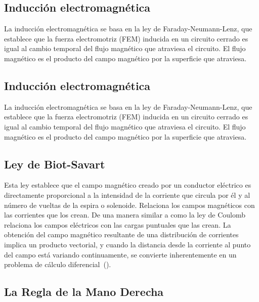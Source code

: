 \documentclass[twocolumn, 12pt]{article}
\begin{document}
\subsection*{Inducción electromagnética}

La inducción electromagnética se basa en la ley de
Faraday-Neumann-Lenz, que establece que la fuerza
electromotriz (FEM) inducida en un circuito cerrado es
igual al cambio temporal del flujo magnético que atraviesa
el circuito. El flujo magnético es el producto del campo
magnético por la superficie que atraviesa.

\subsection*{Inducción electromagnética}

La inducción electromagnética se basa en la ley de
Faraday-Neumann-Lenz, que establece que la fuerza
electromotriz (FEM) inducida en un circuito cerrado es
igual al cambio temporal del flujo magnético que atraviesa
el circuito. El flujo magnético es el producto del campo
magnético por la superficie que atraviesa.

\subsection*{Ley de Biot-Savart}

Esta ley establece que el campo magnético creado por un
conductor eléctrico es directamente proporcional a la
intensidad de la corriente que circula por él y al número
de vueltas de la espira o solenoide. Relaciona los campos
magnéticos con las corrientes que los crean. De una manera
similar a como la ley de Coulomb relaciona los campos
eléctricos con las cargas puntuales que las crean. La
obtención del campo magnético resultante de una
distribución de corrientes implica un producto vectorial, y
cuando la distancia desde la corriente al punto del campo
está variando continuamente, se convierte inherentemente en
un problema de cálculo
diferencial~(\textcite{biot-savart-law}).

\subsection*{La Regla de la Mano Derecha}
\end{document}
